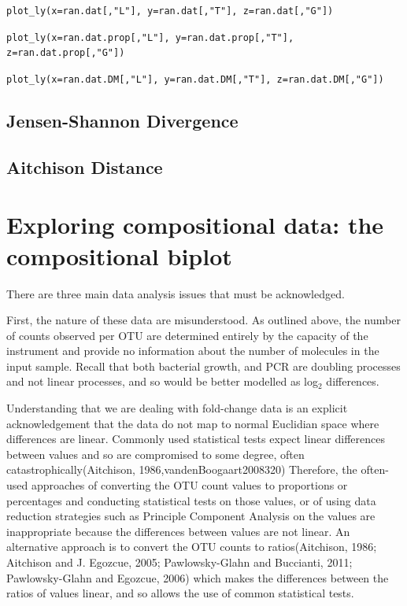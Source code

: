 \documentclass[twocolumn]{article}
\begin{document}
\texttt{plot\_ly(x=ran.dat[,"L"], y=ran.dat[,"T"], z=ran.dat[,"G"])}

\texttt{plot\_ly(x=ran.dat.prop[,"L"], y=ran.dat.prop[,"T"], z=ran.dat.prop[,"G"])}

\texttt{plot\_ly(x=ran.dat.DM[,"L"], y=ran.dat.DM[,"T"], z=ran.dat.DM[,"G"])}

\subsection{Jensen-Shannon Divergence}\subsection{Aitchison Distance}

\section{Exploring compositional data: the compositional
biplot}\label{exploring-compositional-data-the-compositional-biplot}

There are three main data analysis issues that must be acknowledged.

First, the nature of these data are misunderstood. As outlined above,
the number of counts observed per OTU are determined entirely by the
capacity of the instrument and provide no information about the number
of molecules in the input sample. Recall that both bacterial growth, and
PCR are doubling processes and not linear processes, and so would be
better modelled as log\(_2\) differences.

Understanding that we are dealing with fold-change data is an explicit
acknowledgement that the data do not map to normal Euclidian space where
differences are linear. Commonly used statistical tests expect linear
differences between values and so are compromised to some degree, often
catastrophically(Aitchison, 1986,vandenBoogaart2008320) Therefore, the
often-used approaches of converting the OTU count values to proportions
or percentages and conducting statistical tests on those values, or of
using data reduction strategies such as Principle Component Analysis on
the values are inappropriate because the differences between values are
not linear. An alternative approach is to convert the OTU counts to
ratios(Aitchison, 1986; Aitchison and J. Egozcue, 2005; Pawlowsky-Glahn
and Buccianti, 2011; Pawlowsky-Glahn and Egozcue, 2006) which makes the
differences between the ratios of values linear, and so allows the use
of common statistical tests.
\end{document}
